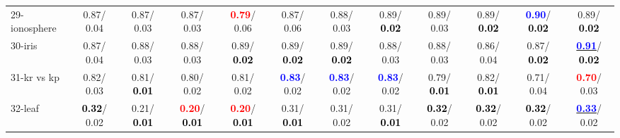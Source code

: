\begin{table}[h]
\begin{center}
{\begin{tabular}{lc|c|c|c|c|c|c|c|c|c|c}
29-ionosphere &   0.87/  0.04 &   0.87/  0.03 &   0.87/  0.03 & \textcolor{red}{\textbf{  0.79}}/  0.06 &   0.87/  0.06 &   0.88/  0.03 &   0.89/\textcolor{black}{\textbf{  0.02}} &   0.89/  0.03 &   0.89/\textcolor{black}{\textbf{  0.02}} & \textcolor{blue}{\textbf{  0.90}}/\textcolor{black}{\textbf{  0.02}} &   0.89/\textcolor{black}{\textbf{  0.02}} \\
30-iris &   0.87/  0.04 &   0.88/  0.03 &   0.88/  0.03 &   0.89/\textcolor{black}{\textbf{  0.02}} &   0.89/\textcolor{black}{\textbf{  0.02}} &   0.89/\textcolor{black}{\textbf{  0.02}} &   0.88/  0.03 &   0.88/  0.03 &   0.86/  0.04 &   0.87/\textcolor{black}{\textbf{  0.02}} & \underline{\textcolor{blue}{\textbf{  0.91}}}/\textcolor{black}{\textbf{  0.02}} \\
31-kr vs kp &   0.82/  0.03 &   0.81/\textcolor{black}{\textbf{  0.01}} &   0.80/  0.02 &   0.81/  0.02 & \textcolor{blue}{\textbf{  0.83}}/  0.02 & \textcolor{blue}{\textbf{  0.83}}/  0.02 & \textcolor{blue}{\textbf{  0.83}}/  0.02 &   0.79/\textcolor{black}{\textbf{  0.01}} &   0.82/\textcolor{black}{\textbf{  0.01}} &   0.71/  0.04 & \textcolor{red}{\textbf{  0.70}}/  0.03 \\
32-leaf & \textcolor{black}{\textbf{  0.32}}/  0.02 &   0.21/\textcolor{black}{\textbf{  0.01}} & \textcolor{red}{\textbf{  0.20}}/\textcolor{black}{\textbf{  0.01}} & \textcolor{red}{\textbf{  0.20}}/\textcolor{black}{\textbf{  0.01}} &   0.31/\textcolor{black}{\textbf{  0.01}} &   0.31/  0.02 &   0.31/\textcolor{black}{\textbf{  0.01}} & \textcolor{black}{\textbf{  0.32}}/  0.02 & \textcolor{black}{\textbf{  0.32}}/  0.02 & \textcolor{black}{\textbf{  0.32}}/  0.02 & \underline{\textcolor{blue}{\textbf{  0.33}}}/  0.02 \\\end{tabular}
}\label{strats0bSVM}
\end{center}
\end{table}
